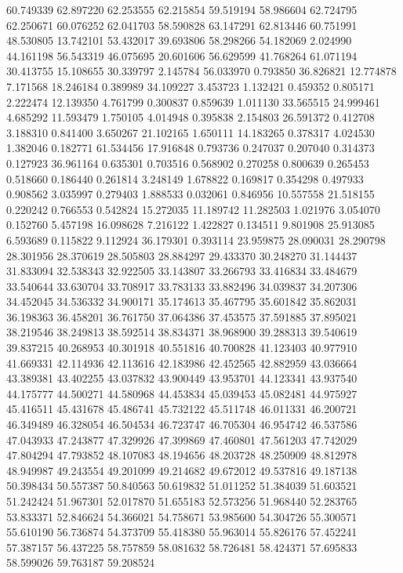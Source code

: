 60.749339
62.897220
62.253555
62.215854
59.519194
58.986604
62.724795
62.250671
60.076252
62.041703
58.590828
63.147291
62.813446
60.751991
48.530805
13.742101
53.432017
39.693806
58.298266
54.182069
2.024990
44.161198
56.543319
46.075695
20.601606
56.629599
41.768264
61.071194
30.413755
15.108655
30.339797
2.145784
56.033970
0.793850
36.826821
12.774878
7.171568
18.246184
0.389989
34.109227
3.453723
1.132421
0.459352
0.805171
2.222474
12.139350
4.761799
0.300837
0.859639
1.011130
33.565515
24.999461
4.685292
11.593479
1.750105
4.014948
0.395838
2.154803
26.591372
0.412708
3.188310
0.841400
3.650267
21.102165
1.650111
14.183265
0.378317
4.024530
1.382046
0.182771
61.534456
17.916848
0.793736
0.247037
0.207040
0.314373
0.127923
36.961164
0.635301
0.703516
0.568902
0.270258
0.800639
0.265453
0.518660
0.186440
0.261814
3.248149
1.678822
0.169817
0.354298
0.497933
0.908562
3.035997
0.279403
1.888533
0.032061
0.846956
10.557558
21.518155
0.220242
0.766553
0.542824
15.272035
11.189742
11.282503
1.021976
3.054070
0.152760
5.457198
16.098628
7.216122
1.422827
0.134511
9.801908
25.913085
6.593689
0.115822
9.112924
36.179301
0.393114
23.959875
28.090031
28.290798
28.301956
28.370619
28.505803
28.884297
29.433370
30.248270
31.144437
31.833094
32.538343
32.922505
33.143807
33.266793
33.416834
33.484679
33.540644
33.630704
33.708917
33.783133
33.882496
34.039837
34.207306
34.452045
34.536332
34.900171
35.174613
35.467795
35.601842
35.862031
36.198363
36.458201
36.761750
37.064386
37.453575
37.591885
37.895021
38.219546
38.249813
38.592514
38.834371
38.968900
39.288313
39.540619
39.837215
40.268953
40.301918
40.551816
40.700828
41.123403
40.977910
41.669331
42.114936
42.113616
42.183986
42.452565
42.882959
43.036664
43.389381
43.402255
43.037832
43.900449
43.953701
44.123341
43.937540
44.175777
44.500271
44.580968
44.453834
45.039453
45.082481
44.975927
45.416511
45.431678
45.486741
45.732122
45.511748
46.011331
46.200721
46.349489
46.328054
46.504534
46.723747
46.705304
46.954742
46.537586
47.043933
47.243877
47.329926
47.399869
47.460801
47.561203
47.742029
47.804294
47.793852
48.107083
48.194656
48.203728
48.250909
48.812978
48.949987
49.243554
49.201099
49.214682
49.672012
49.537816
49.187138
50.398434
50.557387
50.840563
50.619832
51.011252
51.384039
51.603521
51.242424
51.967301
52.017870
51.655183
52.573256
51.968440
52.283765
53.833371
52.846624
54.366021
54.758671
53.985600
54.304726
55.300571
55.610190
56.736874
54.373709
55.418380
55.963014
55.826176
57.452241
57.387157
56.437225
58.757859
58.081632
58.726481
58.424371
57.695833
58.599026
59.763187
59.208524
